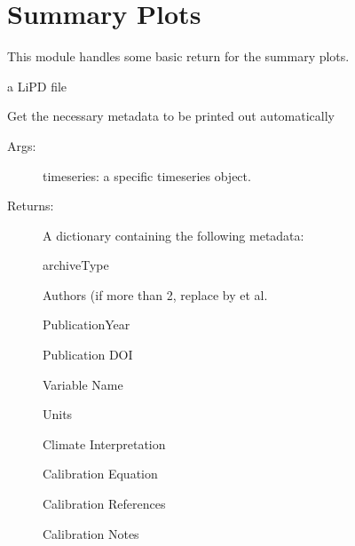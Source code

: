 \documentclass[letterpaper,10pt,english]{sphinxmanual}
\begin{document}
\chapter{Summary Plots}
\label{\detokenize{SummaryPlots:summary-plots}}\label{\detokenize{SummaryPlots::doc}}
This module handles some basic return for the summary plots.

 a LiPD file

\begin{fulllineitems}
\label{\detokenize{SummaryPlots:pyleoclim.SummaryPlots.getMetadata}}
Get the necessary metadata to be printed out automatically
\begin{description}
\item[{Args:}] \leavevmode
timeseries: a specific timeseries object.

\item[{Returns:}] \leavevmode
A dictionary containing the following metadata:

archiveType

Authors (if more than 2, replace by et al.

PublicationYear

Publication DOI

Variable Name

Units

Climate Interpretation

Calibration Equation

Calibration References

Calibration Notes

\end{description}

\end{fulllineitems}

\end{document}
